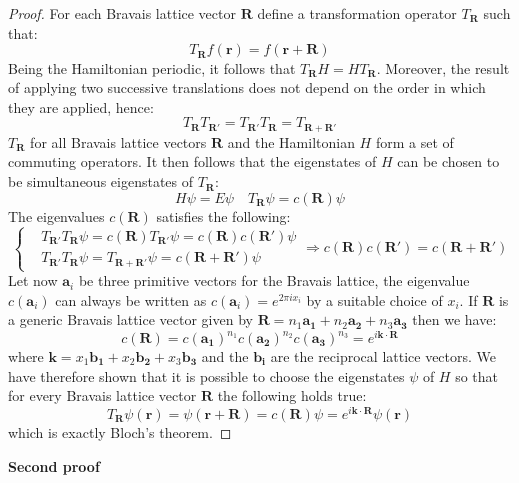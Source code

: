 \documentclass[10.75pt,a4paper,openright,bottom=2cm]{article}
\renewcommand{\Vec}[1]{\boldsymbol{#1}}
\begin{document}
\begin{proof}
For each Bravais lattice vector $\Vec{R}$ define a transformation operator $T_{\Vec{R}}$ such that:
\[
T_{\Vec{R}}f(\Vec{r})=f(\Vec{r}+\Vec{R})
\]
Being the Hamiltonian periodic, it follows that $T_{\Vec{R}}H=HT_{\Vec{R}}$. Moreover, the result of applying two successive translations does not depend on the order in which they are applied, hence:
\[
T_{\Vec{R}}T_{\Vec{R'}}=T_{\Vec{R'}}T_{\Vec{R}}=T_{\Vec{R}+\Vec{R'}}
\]
$T_{\Vec{R}}$ for all Bravais lattice vectors $\Vec{R}$ and the Hamiltonian $H$ form a set of commuting operators. It then follows that the eigenstates of $H$ can be chosen to be simultaneous eigenstates of $T_{\Vec{R}}$:
\[
H\psi=E\psi \quad T_{\Vec{R}}\psi=c(\Vec{R})\psi
\]
The eigenvalues $c(\Vec{R})$ satisfies the following:
\[
\left\{
\begin{aligned}
&T_{\Vec{R}'}T_{\Vec{R}}\psi=c(\Vec{R})T_{\Vec{R}'}\psi=c(\Vec{R})c(\Vec{R}')\psi\\
&T_{\Vec{R}'}T_{\Vec{R}}\psi=T_{\Vec{R}+\Vec{R}'}\psi=c(\Vec{R}+\Vec{R}')\psi
\end{aligned}
\right.
\Rightarrow
c(\Vec{R})c(\Vec{R}')=c(\Vec{R}+\Vec{R}')
\]
Let now $\Vec{a}_i$ be three primitive vectors for the Bravais lattice, the eigenvalue $c(\Vec{a}_i)$ can always be written as $c(\Vec{a}_i)=e^{2\pi ix_i}$ by a suitable choice of $x_i$. If $\Vec{R}$ is a generic Bravais lattice vector given by $\Vec{R}=n_1\Vec{a_1}+n_2\Vec{a_2}+n_3\Vec{a_3}$ then we have:
\[
c(\Vec{R})=c(\Vec{a_1})^{n_1}c(\Vec{a_2})^{n_2}c(\Vec{a_3})^{n_3}=e^{i\Vec{k}\cdot\Vec{R}}
\]
where $\Vec{k}=x_1\Vec{b_1}+x_2\Vec{b_2}+x_3\Vec{b_3}$ and the $\Vec{b_i}$ are the reciprocal lattice vectors. We have therefore shown that it is possible to choose the eigenstates $\psi$ of $H$ so that for every Bravais lattice vector $\Vec{R}$ the following holds true:
\[
T_{\Vec{R}}\psi(\Vec{r})=\psi(\Vec{r}+\Vec{R})=c(\Vec{R})\psi=e^{i\Vec{k}\cdot\Vec{R}}\psi(\Vec{r})
\]
which is exactly Bloch's theorem.
\end{proof}
\noindent\textbf{Second proof}
\end{document}
